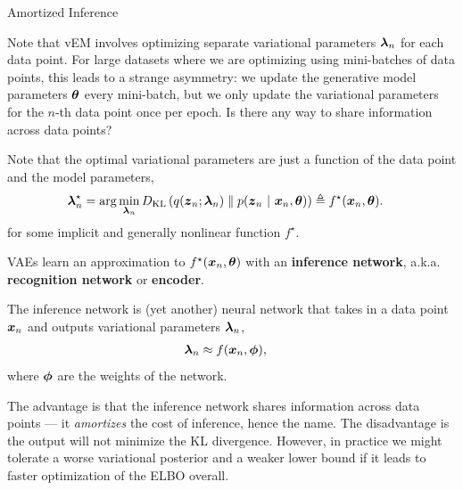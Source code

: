 \documentclass[aspectratio=169]{beamer}
\begin{document}
\begin{frame}[t,allowframebreaks]{Amortized Inference}\label{amortized-inference}

Note that vEM involves optimizing separate variational parameters
\(\boldsymbol{\lambda}_n\) for each data point. For large datasets where we are
optimizing using mini-batches of data points, this leads to a strange
asymmetry: we update the generative model parameters \(\boldsymbol{\theta}\) every
mini-batch, but we only update the variational parameters for the
\(n\)-th data point once per epoch. Is there any way to share
information across data points?

Note that the optimal variational parameters are just a function of the
data point and the model parameters, 
\begin{align*}
    \boldsymbol{\lambda}_n^\star &= \arg \min_{\boldsymbol{\lambda}_n} D_{\textrm{KL}}\left(q(\boldsymbol{z}_n; \boldsymbol{\lambda}_n)\;\|\;p(\boldsymbol{z}_n ~\vert~ \boldsymbol{x}_n, \boldsymbol{\theta})\right) 
    \triangleq f^\star(\boldsymbol{x}_n, \boldsymbol{\theta}).
\end{align*} 
for some implicit and generally nonlinear function
\(f^\star\).

VAEs learn an approximation to \(f^\star(\boldsymbol{x}_n, \boldsymbol{\theta})\) with an
\textbf{inference network}, a.k.a. \textbf{recognition network} or
\textbf{encoder}.

The inference network is (yet another) neural network that takes in a
data point \(\boldsymbol{x}_n\) and outputs variational parameters
\(\boldsymbol{\lambda}_n\), \begin{align*}
    \boldsymbol{\lambda}_n & \approx f(\boldsymbol{x}_n, \boldsymbol{\phi}),
\end{align*} where \(\boldsymbol{\phi}\) are the weights of the network.

The advantage is that the inference network shares information across
data points --- it \emph{amortizes} the cost of inference, hence the
name. The disadvantage is the output will not minimize the KL
divergence. However, in practice we might tolerate a worse variational
posterior and a weaker lower bound if it leads to faster optimization of
the ELBO overall.
\end{frame}
\end{document}
